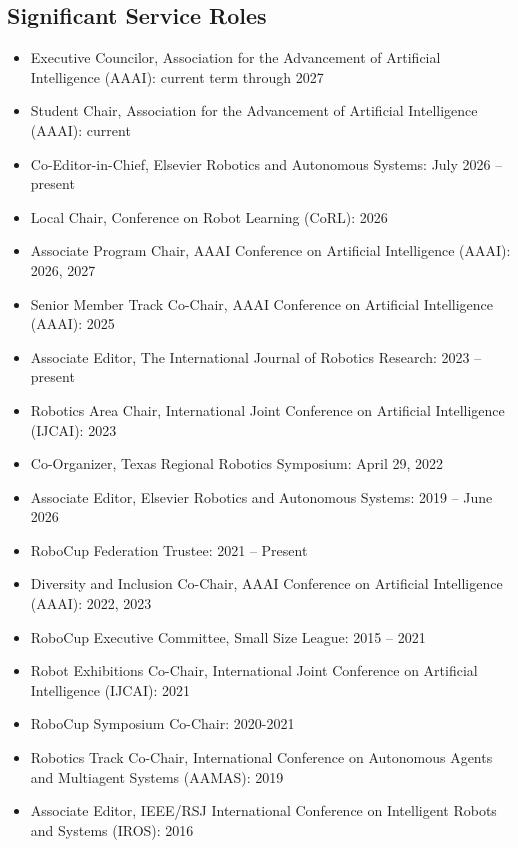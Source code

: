 \documentclass[Times]{article}
\begin{document}
\subsection*{Significant Service Roles}

\begin{itemize}
  \item Executive Councilor, Association for the Advancement of Artificial Intelligence (AAAI): current term through 2027
  \item Student Chair, Association for the Advancement of Artificial Intelligence (AAAI): current
  \item Co-Editor-in-Chief, Elsevier Robotics and Autonomous Systems: July 2026 -- present
  \item Local Chair, Conference on Robot Learning (CoRL): 2026
  \item Associate Program Chair, AAAI Conference on Artificial Intelligence (AAAI): 2026, 2027
  \item Senior Member Track Co-Chair, AAAI Conference on Artificial Intelligence (AAAI): 2025
  \item Associate Editor, The International Journal of Robotics Research: 2023 -- present
  \item Robotics Area Chair, International Joint Conference on Artificial Intelligence (IJCAI): 2023
  \item Co-Organizer, Texas Regional Robotics Symposium: April 29, 2022
  \item Associate Editor, Elsevier Robotics and Autonomous Systems: 2019 -- June 2026
  \item RoboCup Federation Trustee: 2021 -- Present
  \item Diversity and Inclusion Co-Chair, AAAI Conference on Artificial
  Intelligence (AAAI): 2022, 2023
  \item RoboCup Executive Committee, Small Size League: 2015 -- 2021
  \item Robot Exhibitions Co-Chair, International Joint Conference on Artificial Intelligence (IJCAI): 2021
  \item RoboCup Symposium Co-Chair: 2020-2021
\item Robotics Track Co-Chair, International Conference on Autonomous Agents and
Multiagent Systems (AAMAS): 2019
  \item Associate Editor, IEEE/RSJ International Conference on Intelligent
Robots and Systems (IROS): 2016
\end{itemize}
\end{document}
